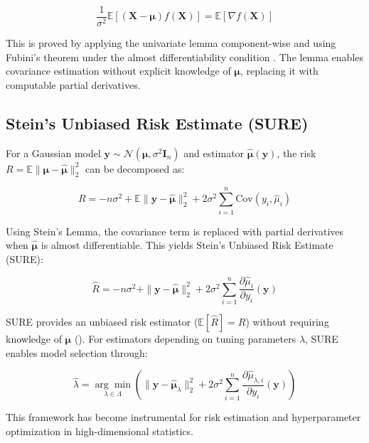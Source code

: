 \documentclass{article}
\begin{document}
\begin{equation}
    \frac{1}{\sigma^2}\mathbb{E}[(\mathbf{X} - \boldsymbol{\mu})f(\mathbf{X})] = \mathbb{E}[\nabla f(\mathbf{X})]
\end{equation}

This is proved by applying the univariate lemma component-wise and using Fubini's theorem under the almost differentiability condition \citet{Tibshirani2015SteinS}. The lemma enables covariance estimation without explicit knowledge of $\boldsymbol{\mu}$, replacing it with computable partial derivatives.

\subsection{Stein's Unbiased Risk Estimate (SURE)}
For a Gaussian model $\mathbf{y} \sim \mathcal{N}(\boldsymbol{\mu}, \sigma^2 \mathbf{I}_n)$ and estimator $\boldsymbol{\hat{\mu}}(\mathbf{y})$, the risk $R = \mathbb{E}\|\boldsymbol{\mu} - \boldsymbol{\hat{\mu}}\|_2^2$ can be decomposed as:

\begin{equation}
R = -n\sigma^2 + \mathbb{E}\|\mathbf{y} - \boldsymbol{\hat{\mu}}\|_2^2 + 2\sigma^2 \sum_{i=1}^n \text{Cov}(y_i, \hat{\mu}_i)
\end{equation}


Using Stein's Lemma, the covariance term is replaced with partial derivatives when $\boldsymbol{\hat{\mu}}$ is almost differentiable. This yields Stein's Unbiased Risk Estimate (SURE):

\begin{equation}
    \widehat{R} = -n\sigma^2 + \|\mathbf{y} - \boldsymbol{\hat{\mu}}\|_2^2 + 2\sigma^2 \sum_{i=1}^n \frac{\partial \hat{\mu}_i}{\partial y_i}(\mathbf{y})
\end{equation}

SURE provides an unbiased risk estimator ($\mathbb{E}[\widehat{R}] = R$) without requiring knowledge of $\boldsymbol{\mu}$ (\cite{Tibshirani2015SteinS}). For estimators depending on tuning parameters $\lambda$, SURE enables model selection through:

\begin{equation}
\hat{\lambda} = \underset{\lambda \in \Lambda}{\arg\min} \left( \|\mathbf{y} - \boldsymbol{\hat{\mu}}_\lambda\|_2^2 + 2\sigma^2 \sum_{i=1}^n \frac{\partial \hat{\mu}_{\lambda,i}}{\partial y_i}(\mathbf{y}) \right)
\end{equation}


This framework has become instrumental for risk estimation and hyperparameter optimization in high-dimensional statistics.
\end{document}
